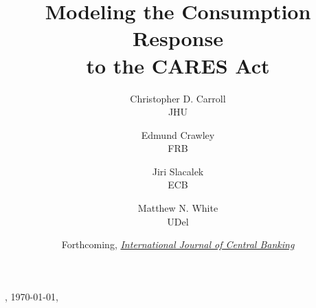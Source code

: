 \documentclass[titlepage,letterpaper]{\econtex}
\providecommand{\versn}{}
\renewcommand{\forcedate}{Forthcoming, \href{https://www.ijcb.org/}{\textit{International Journal of Central Banking}}}
\begin{document}
\hfill{\tiny \jobname \versn, \today, \currenttime}

\title{Modeling the Consumption Response\\ to the CARES Act}

{%
  \author{
    Christopher D. Carroll\authNum \\ {\small JHU}
    \and
    Edmund Crawley\authNum   \\ {\small FRB}
    \and
    Jiri Slacalek\authNum    \\ {\small ECB}
    \and
    Matthew N. White\authNum \\ {\small UDel}
  }
} %

  
\date{\forcedate}
\maketitle

\hypertarget{links}{}

\newcommand{\dashtarg}{Live Dashboard}
\newcommand{\htmltarg}{econ-ark.github.io/Pandemic}
\newcommand{\githtarg}{github.com/econ-ark/Pandemic}
\newcommand{\zipftarg}{zip~file:~~root~of~repo}
\newcommand{\latetarg}{LaTeX~directory~in~repo}
\newcommand{\subttarg}{LaTeX~directory~in~repo}

\newcommand{\githrepo}{\href{https://github.com/econ-ark/Pandemic}{\githtarg}}
\newcommand{\githtext}{Full codebase: Modify combos of assumptions}
\newcommand{\zipftext}{contains full replication files (code+text)}
\newcommand{\dashlive}{\href{https://econ-ark.org/materials/pandemic\#dashboard}{\dashtarg}}
\newcommand{\dashtext}{See effect of modifying main assumptions}
\newcommand{\htmlvers}{\href{https://econ-ark.github.io/Pandemic}{\htmltarg}}
\newcommand{\htmltext}{HTML version of paper}
\newcommand{\pdfltsub}{\href{https://github.com/econ-ark/Pandemic/blob/master/LaTeX/ConsumptionResponse.pdf}{\latetarg}}
\newcommand{\pdflttxt}{PDF~version~of~paper}
\newcommand{\slidesub}{\href{https://github.com/econ-ark/Pandemic/blob/master/LaTeX/ConsumptionResponse-Slides.pdf}{\subttarg}}
\newcommand{\slidetxt}{Presentation slides}
\newcommand{\bibtlink}{\href{https://raw.githubusercontent.com/econ-ark/Pandemic/gh-pages/LaTeX/ConsumptionResponse-Self.bib}{\subttarg}}
\newcommand{\bibttext}{Preferred BibTeX citation}
\newcommand{\zipflink}{\href{https://github.com/econ-ark/Pandemic/raw/master/ConsumptionResponse.zip  }{\zipftarg}}
\end{document}
